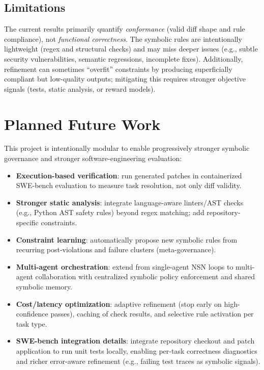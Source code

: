 \documentclass[conference]{IEEEtran}
\begin{document}
\subsection{Limitations}
The current results primarily quantify \emph{conformance} (valid diff shape and rule compliance), not \emph{functional correctness}. The symbolic rules are intentionally lightweight (regex and structural checks) and may miss deeper issues (e.g., subtle security vulnerabilities, semantic regressions, incomplete fixes). Additionally, refinement can sometimes ``overfit'' constraints by producing superficially compliant but low-quality outputs; mitigating this requires stronger objective signals (tests, static analysis, or reward models).

\section{Planned Future Work}
\label{sec:future}
This project is intentionally modular to enable progressively stronger symbolic governance and stronger software-engineering evaluation:
\begin{itemize}
  \item \textbf{Execution-based verification}: run generated patches in containerized SWE-bench evaluation to measure task resolution, not only diff validity.
  \item \textbf{Stronger static analysis}: integrate language-aware linters/AST checks (e.g., Python AST safety rules) beyond regex matching; add repository-specific constraints.
  \item \textbf{Constraint learning}: automatically propose new symbolic rules from recurring post-violations and failure clusters (meta-governance).
  \item \textbf{Multi-agent orchestration}: extend from single-agent NSN loops to multi-agent collaboration with centralized symbolic policy enforcement and shared symbolic memory.
  \item \textbf{Cost/latency optimization}: adaptive refinement (stop early on high-confidence passes), caching of check results, and selective rule activation per task type.
  \item \textbf{SWE-bench integration details}: integrate repository checkout and patch application to run unit tests locally, enabling per-task correctness diagnostics and richer error-aware refinement (e.g., failing test traces as symbolic signals).
\end{itemize}
\end{document}
